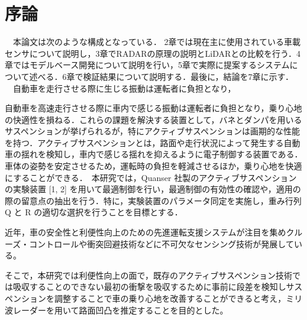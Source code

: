 \chapter{序論}
　本論文は次のような構成となっている． 2章では現在主に使用されている車載センサについて説明し，3章でRADARの原理の説明とLiDARとの比較を行う．4章ではモデルベース開発について説明を行い，5章で実際に提案するシステムについて述べる．6章で検証結果について説明する．最後に，結論を7章に示す．\\

　自動車を走行させる際に生じる振動は運転者に負担となり，


自動車を高速走行させる際に車内で感じる振動は運転者に負担となり，乗り心地の快適性を損ねる．これらの課題を解決する装置として，バネとダンパを用いるサスペンションが挙げられるが，特にアクティブサスペンションは画期的な性能を持つ．アクティブサスペンションとは，路面や走行状況によって発生する自動車の揺れを検知し，車内で感じる揺れを抑えるように電子制御する装置である．車体の姿勢を安定させるため，運転時の負担を軽減させるほか，乗り心地を快適にすることができる．　本研究では，Quanser 社製のアクティブサスペンションの実験装置 [1, 2] を用いて最適制御を行い，最適制御の有効性の確認や，適用の際の留意点の抽出を行う．特に，実験装置のパラメータ同定を実施し，重み行列 Q と R の適切な選択を行うことを目標とする．


近年，車の安全性と利便性向上のための先進運転支援システムが注目を集めクルーズ・コントロールや衝突回避技術などに不可欠なセンシング技術が発展している。

そこで，本研究では利便性向上の面で，既存のアクティブサスペンション技術では吸収することのできない最初の衝撃を吸収するために事前に段差を検知しサスペンションを調整することで車の乗り心地を改善することができると考え，ミリ波レーダーを用いて路面凹凸を推定することを目的とした。


